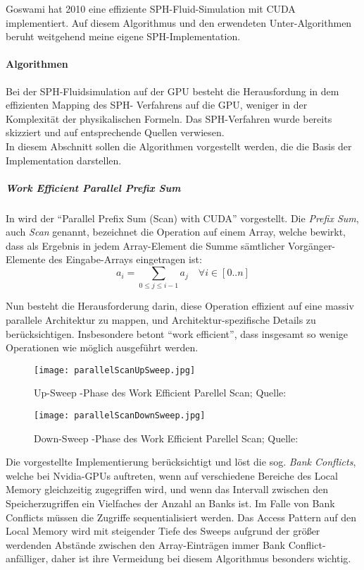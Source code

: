 	Goswami \cite{Goswami2010} hat 2010 eine effiziente SPH-Fluid-Simulation mit CUDA implementiert. Auf diesem
	Algorithmus und den erwendeten Unter-Algorithmen beruht weitgehend meine eigene SPH-Implementation.
	
	

	\paragraph{Algorithmen}
	Bei der SPH-Fluidsimulation auf der GPU besteht die Herausfordung in dem effizienten Mapping des SPH-
	Verfahrens auf die GPU, weniger in der Komplexität der physikalischen Formeln. Das SPH-Verfahren wurde
	bereits skizziert und auf entsprechende Quellen verwiesen.\\
	In diesem Abschnitt sollen die Algorithmen vorgestellt werden, die die Basis der Implementation darstellen.

		\subparagraph{Work Efficient Parallel Prefix Sum}
		In \cite{Harris2007} wird der "`Parallel Prefix Sum (Scan) with CUDA"' vorgestellt.
		Die \emph{Prefix Sum}, auch \emph{Scan} genannt, bezeichnet die Operation auf einem Array, 
		welche bewirkt, dass als Ergebnis in jedem Array-Element die Summe sämtlicher Vorgänger-Elemente 
		des Eingabe-Arrays eingetragen ist:
		\begin{equation}
			a_i = \sum_{0\le j \le i-1} a_j		\quad		 \forall i \in [0..n]
		\end{equation}
		
		Nun besteht die Herausforderung darin, diese Operation effizient auf eine massiv parallele 
		Architektur zu mappen, und Architektur-spezifische Details zu berücksichtigen.
		Insbesondere betont "`work efficient"', dass insgesamt so wenige Operationen wie möglich
		ausgeführt werden.
		
		\begin{figure}[!h]
		\texttt{[image: parallelScanUpSweep.jpg]}
		\caption{Up-Sweep -Phase des Work Efficient Parellel Scan; Quelle: \cite{Harris2007} }
		\label{fig:parScanUpSweep}
		\end{figure}
		
		\begin{figure}[!h]
		\texttt{[image: parallelScanDownSweep.jpg]}
		\caption{Down-Sweep -Phase des Work Efficient Parellel Scan; Quelle: \cite{Harris2007} }
		\label{fig:parScanDownSweep}
		\end{figure}
		
		Die vorgestellte Implementierung berücksichtigt und löst die sog. \emph{Bank Conflicts}, welche
		bei Nvidia-GPUs auftreten, wenn auf verschiedene Bereiche des Local Memory gleichzeitig 
		zugegriffen wird, und wenn das Intervall zwischen den Speicherzugriffen ein Vielfaches der
		Anzahl an Banks ist. Im Falle von Bank Conflicts müssen die Zugriffe sequentialisiert werden.
		Das Access Pattern auf den Local Memory wird mit steigender Tiefe
		des Sweeps aufgrund der größer werdenden Abstände zwischen den Array-Einträgen immer Bank Conflict-anfälliger,
		daher ist ihre Vermeidung bei diesem Algorithmus besonders wichtig.
		
